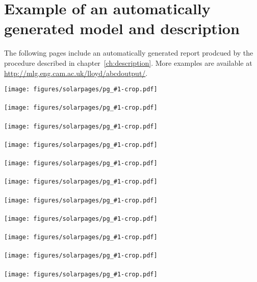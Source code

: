 
\inbpdocument

\chapter{Example of an automatically generated model and description}
\label{ch:example-solar}

The following pages include an automatically generated report prodcued by the procedure described in chapter~\ref{ch:description}.
More examples are available at \url{http://mlg.eng.cam.ac.uk/lloyd/abcdoutput/}.

\newpage

\newcommand{\solarreportpage}[1]{\texttt{[image: figures/solarpages/pg\_\#1-crop.pdf]}}

\solarreportpage{0002}
\\ \vspace{1cm} \\
\solarreportpage{0003}
\\ \vspace{1cm} \\
\solarreportpage{0004}
\\ \vspace{1cm} \\
\solarreportpage{0005}
\\ \vspace{1cm} \\
\solarreportpage{0006}
\\ \vspace{1cm} \\
\solarreportpage{0007}
\\ \vspace{1cm} \\
\solarreportpage{0008}
\\ \vspace{1cm} \\
\solarreportpage{0009}
\\ \vspace{1cm} \\
\solarreportpage{0010}
\\ \vspace{1cm} \\
\solarreportpage{0011}
\\ \vspace{1cm} \\
\solarreportpage{0012}
\\ \vspace{1cm} \\
